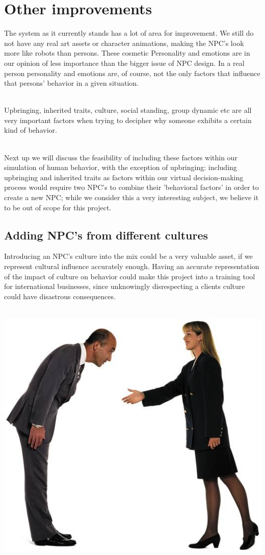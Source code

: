 \documentclass[11pt]{article} %
\begin{document}
\newpage
\section{Other improvements}
The system as it currently stands has a lot of area for improvement. We still do not have any real art assets or character animations, making the NPC's look more like robots than persons. These cosmetic Personality and emotions are in our opinion of less importance than the bigger issue of NPC design. In a real person personality and emotions are, of course, not the only factors that influence that persons' behavior in a given situation. 


~\\
Upbringing, inherited traits, culture, social standing, group dynamic etc are all very important factors when trying to decipher why someone exhibits a certain kind of behavior.

~\\
Next up we will discuss the feasibility of including these factors within our simulation of human behavior, with the exception of upbringing:
including upbringing and inherited traits as factors within our virtual decision-making process would require two NPC's to combine their 'behavioral factors' in order to create a new NPC; while we consider this a very interesting subject, we believe it to be out of scope for this project. 

\newpage
\subsection{Adding NPC's from different cultures}
Introducing an NPC's culture into the mix could be a very valuable asset, if we represent cultural influence accurately enough. Having an accurate representation of the impact of culture on behavior could make this project into a training tool for international businesses, since unknowingly disrespecting a clients culture could have disastrous consequences.

~\\
\includegraphics[scale=0.7]{Culture}
\end{document}
